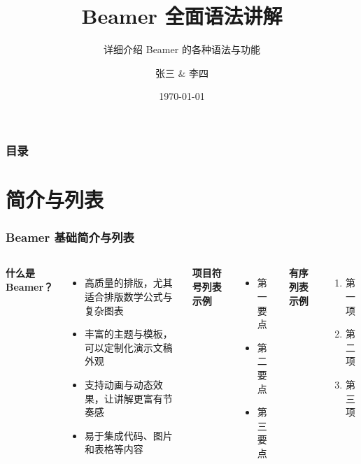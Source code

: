 \documentclass[10pt,aspectratio=169,mathserif]{beamer}
\title{Beamer 全面语法讲解}         %
\subtitle{详细介绍 Beamer 的各种语法与功能} %
\author{张三 \& 李四}               %
\institute{某某大学 \\ 某某研究所}    %
\date{\today}                   %
\begin{document}
\begin{frame}
    \titlepage  
\end{frame}

\begin{frame}
    \frametitle{目录}
    \tableofcontents
\end{frame}

\section{简介与列表}
\begin{frame}
    \frametitle{Beamer 基础简介与列表}
    \begin{columns}[T] %
        \textbf{什么是 Beamer？}
        \begin{itemize}
            \item 高质量的排版，尤其适合排版数学公式与复杂图表
            \item 丰富的主题与模板，可以定制化演示文稿外观
            \item 支持动画与动态效果，让讲解更富有节奏感
            \item 易于集成代码、图片和表格等内容
        \end{itemize}

        \textbf{项目符号列表示例}
        \begin{itemize}
            \item 第一要点
            \item 第二要点
            \item 第三要点
        \end{itemize}
        
        \textbf{有序列表示例}
        \begin{enumerate}
            \item 第一项
            \item 第二项
            \item 第三项
        \end{enumerate}
    \end{columns}
\end{frame}
\end{document}
